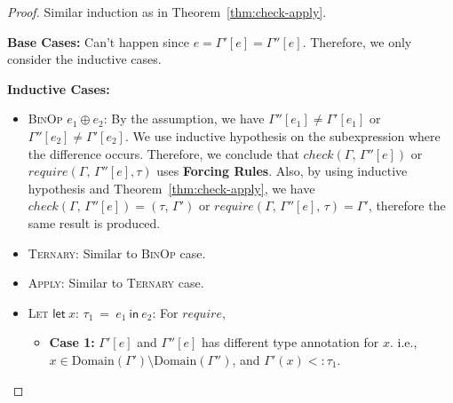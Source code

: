 \documentclass[peerreview, 10pt]{IEEEtran}
\newcommand{\lett}[4]{\ensuremath{\mathsf{let}\ #1\mathsf{:}\,#2\ \mathsf{=}\ #3\ \mathsf{in}\ #4}}
\newcommand{\binop}[2]{\ensuremath{#1\ \mathsf{\oplus}\ #2}}
\newcommand{\checktype}[4]{\ensuremath{{check}(#1,\,#2)=(#3,\,#4)}}
\newcommand{\requiretype}[4]{\ensuremath{{require}(#1,\,#2,\,#3)=#4}}
\newcommand{\domain}[1]{\ensuremath{\text{Domain}(#1)}}
\begin{document}
\begin{proof}
    Similar induction as in Theorem~\ref{thm:check-apply}.

    \textbf{Base Cases:} Can't happen since $e=\Gamma'[e]=\Gamma''[e]$. Therefore, we only consider the inductive cases.

    \textbf{Inductive Cases:}
    \begin{itemize}
        \item \textsc{BinOp} \binop{e_1}{e_2}: By the assumption, we have $\Gamma''[e_1]\neq\Gamma'[e_1]$ or $\Gamma''[e_2]\neq\Gamma'[e_2]$. We use inductive hypothesis on the subexpression where the difference occurs. Therefore, we conclude that $check(\Gamma,\,\Gamma''[e])$ or $require(\Gamma,\,\Gamma''[e], \tau)$ uses \textbf{Forcing Rules}. Also, by using inductive hypothesis and Theorem~\ref{thm:check-apply}, we have $\checktype{\Gamma}{\Gamma''[e]}{\tau}{\Gamma'}$ or $\requiretype{\Gamma}{\Gamma''[e]}{\tau}{\Gamma'}$, therefore the same result is produced.
        \item \textsc{Ternary}: Similar to \textsc{BinOp} case.
        \item \textsc{Apply}: Similar to \textsc{Ternary} case.
        \item \textsc{Let} \lett{x}{\tau_1}{e_1}{e_2}: For $require$,
        \begin{itemize}
            \item \textbf{Case 1:} $\Gamma'[e]$ and $\Gamma''[e]$ has different type annotation for $x$. i.e., $x\in\domain{\Gamma'}\setminus\domain{\Gamma''}$, and $\Gamma'(x) <: \tau_1$.


\end{itemize}
\end{itemize}
\end{proof}
\end{document}

